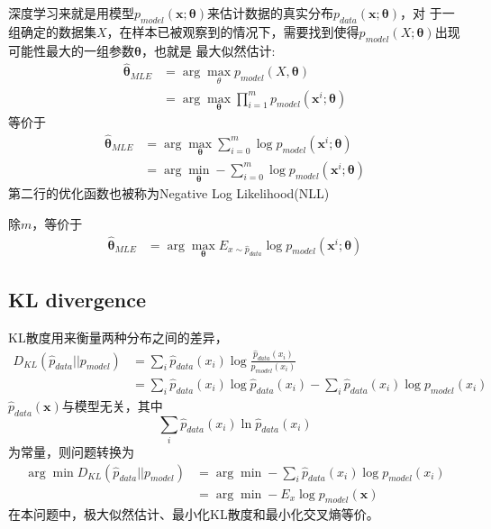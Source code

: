 深度学习来就是用模型$p_{model}(\boldsymbol{x};\boldsymbol{\theta})$来估计数据的真实分布$p_{data}(\boldsymbol{x};\boldsymbol{\theta})$，对
于一组确定的数据集$X$，在样本已被观察到的情况下，需要找到使得$p_{model}(X; \boldsymbol{\theta})$出现可能性最大的一组参数$\boldsymbol{\theta}$，也就是
最大似然估计:
\begin{equation}
    \begin{split}
        \hat{\boldsymbol{\theta}}_{MLE} &= \arg \max_\theta p_{model}(X, \boldsymbol{\theta}) \\
        &= \arg \max_{\boldsymbol{\theta}} \prod _{i=1}^m p_{model}(\boldsymbol{x}^i; \boldsymbol{\theta})
    \end{split}
\end{equation}
等价于
\begin{equation}
    \begin{split}
        \hat{\boldsymbol{\theta}}_{MLE} &= \arg \max_{\boldsymbol{\theta}} \sum_{i=0}^m \log p_{model}(\boldsymbol{x}^i; \boldsymbol{\theta}) \\
        &= \arg \min_{\boldsymbol{\theta}} - \sum_{i=0}^m \log p_{model}(\boldsymbol{x}^i; \boldsymbol{\theta})
    \end{split}
\end{equation}
第二行的优化函数也被称为Negative Log Likelihood(NLL)


除$m$，等价于
\begin{equation}
    \begin{split}
        \hat{\boldsymbol{\theta}}_{MLE} &= \arg \max_{\boldsymbol{\theta}} E _{x \sim \hat p_{data}} \log p_{model}(\boldsymbol{x}^i; \boldsymbol{\theta})
    \end{split}
\end{equation}

\subsection{KL divergence}
KL散度用来衡量两种分布之间的差异，
\begin{equation}
    \begin{split}
        D_{KL}(\hat p_{data}|| p_{model}) &= \sum_i \hat p_{data}(x_i) \log{\frac{\hat p_{data}(x_i)}{p_{model}(x_i)}}\\
        &= \sum_i \hat p_{data}(x_i) \log\hat p_{data}(x_i) - \sum_i \hat p_{data}(x_i) \log p_{model}(x_i)
    \end{split}
\end{equation}
$\hat p_{data}(\boldsymbol{x})$与模型无关，其中
\begin{equation}
    \sum_i \hat p_{data}(x_i) \ln\hat p_{data}(x_i)
\end{equation}
为常量，则问题转换为
\begin{equation}
    \begin{split}
        \arg \min D_{KL}(\hat p_{data}|| p_{model}) &= \arg \min - \sum_i \hat p_{data}(x_i) \log p_{model}(x_i)\\
        &= \arg \min - E_x \log p_{model}(\mathbf{x})
    \end{split}
\end{equation}
在本问题中，极大似然估计、最小化KL散度和最小化交叉熵等价。

